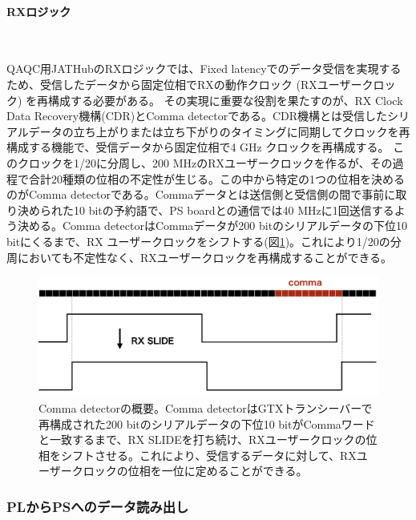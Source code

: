 \paragraph{RXロジック}　\par
QAQC用JATHubのRXロジックでは、Fixed latencyでのデータ受信を実現するため、受信したデータから固定位相でRXの動作クロック (RXユーザークロック) を再構成する必要がある。
その実現に重要な役割を果たすのが、RX Clock Data Recovery機構(CDR)とComma detectorである。CDR機構とは受信したシリアルデータの立ち上がりまたは立ち下がりのタイミングに同期してクロックを再構成する機能で、受信データから固定位相で4 GHz クロックを再構成する。
このクロックを1/20に分周し、200 MHzのRXユーザークロックを作るが、その過程で合計20種類の位相の不定性が生じる。この中から特定の1つの位相を決めるのがComma detectorである。Commaデータとは送信側と受信側の間で事前に取り決められた10 bitの予約語で、PS boardとの通信では40 MHzに1回送信するよう決める。Comma detectorはCommaデータが200 bitのシリアルデータの下位10 bitにくるまで、RX ユーザークロックをシフトする(図\ref{JATHubcomma})。これにより1/20の分周においても不定性なく、RXユーザークロックを再構成することができる。

\begin{figure} 
\centering
\includegraphics[width=16cm]{fig/QAQC/JATHubcomma.png}
\caption[Comma detectorの概要]{Comma detectorの概要。Comma detectorはGTXトランシーバーで再構成された200 bitのシリアルデータの下位10 bitがCommaワードと一致するまで、RX SLIDEを打ち続け、RXユーザークロックの位相をシフトさせる。これにより、受信するデータに対して、RXユーザークロックの位相を一位に定めることができる。}
\label{JATHubcomma}
\end{figure}


\subsubsection{PLからPSへのデータ読み出し}
\baselineskip
\label{subsubsec_readout}


